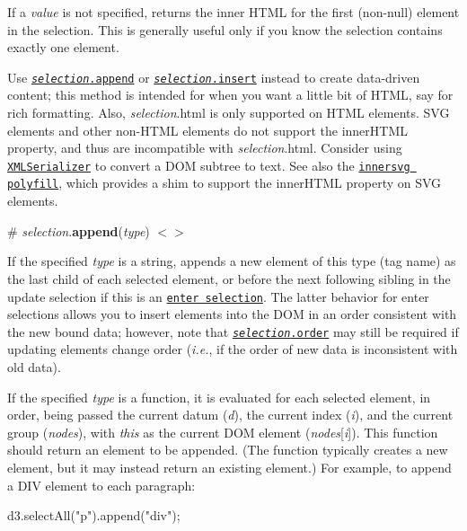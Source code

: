 If a {\itshape value} is not specified, returns the inner H\+T\+ML for the first (non-\/null) element in the selection. This is generally useful only if you know the selection contains exactly one element.

Use \href{#selection_append}{\tt {\itshape selection}.append} or \href{#selection_insert}{\tt {\itshape selection}.insert} instead to create data-\/driven content; this method is intended for when you want a little bit of H\+T\+ML, say for rich formatting. Also, {\itshape selection}.html is only supported on H\+T\+ML elements. S\+VG elements and other non-\/\+H\+T\+ML elements do not support the inner\+H\+T\+ML property, and thus are incompatible with {\itshape selection}.html. Consider using \href{https://developer.mozilla.org/en-US/docs/XMLSerializer}{\tt X\+M\+L\+Serializer} to convert a D\+OM subtree to text. See also the \href{https://code.google.com/p/innersvg/}{\tt innersvg polyfill}, which provides a shim to support the inner\+H\+T\+ML property on S\+VG elements.

\label{_selection_append}%
\# {\itshape selection}.{\bfseries append}({\itshape type}) \href{https://github.com/d3/d3-selection/blob/master/src/selection/append.js}{\tt $<$$>$}

If the specified {\itshape type} is a string, appends a new element of this type (tag name) as the last child of each selected element, or before the next following sibling in the update selection if this is an \href{#selection_enter}{\tt enter selection}. The latter behavior for enter selections allows you to insert elements into the D\+OM in an order consistent with the new bound data; however, note that \href{#selection_order}{\tt {\itshape selection}.order} may still be required if updating elements change order ({\itshape i.\+e.}, if the order of new data is inconsistent with old data).

If the specified {\itshape type} is a function, it is evaluated for each selected element, in order, being passed the current datum ({\itshape d}), the current index ({\itshape i}), and the current group ({\itshape nodes}), with {\itshape this} as the current D\+OM element ({\itshape nodes}\mbox{[}{\itshape i}\mbox{]}). This function should return an element to be appended. (The function typically creates a new element, but it may instead return an existing element.) For example, to append a D\+IV element to each paragraph\+:


\begin{DoxyCode}
d3.selectAll("p").append("div");
\end{DoxyCode}


